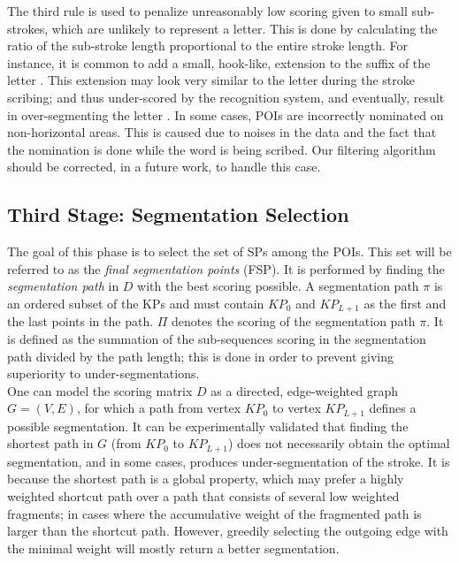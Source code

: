 \documentclass[10pt, conference, compsocconf]{IEEEtran}
\begin{document}
The third rule is used to penalize unreasonably low scoring given to small sub-strokes, which are unlikely to represent a letter. 
This is done by calculating the ratio of the sub-stroke length proportional to the entire stroke length.
For instance, it is common to add a small, hook-like, extension to the suffix of the letter . 
This extension may look very similar to the letter  during the stroke scribing; and thus under-scored by the recognition system, and eventually, result in over-segmenting the letter . In some cases, POIs are incorrectly nominated on non-horizontal areas. This is caused due to noises in the data and the fact that the nomination is done while the word is being scribed. Our filtering algorithm should be corrected, in a future work, to handle this case.

\subsection{Third Stage: Segmentation Selection}
The goal of this phase is to select the set of SPs among the POIs. 
This set will be referred to as the \emph{final segmentation points} (FSP). 
It is performed by finding the \emph{segmentation path} in $D$ with the best scoring possible. 
A segmentation path $\pi$ is an ordered subset of the KPs and must contain $KP_{0}$ and $KP_{L+1}$ as the first and the last points in the path.
$\Pi$ denotes the scoring of the segmentation path $\pi$. 
It is defined as the summation of the sub-sequences scoring in the segmentation path divided by the path length; this is done in order to prevent giving superiority to under-segmentations.\\

One can model the scoring matrix $D$ as a directed, edge-weighted graph $G=(V,E)$, for which a path from vertex $KP_0$ to vertex $KP_{L+1}$ defines a possible segmentation. 
It can be experimentally validated that finding the shortest path in $G$ (from $KP_0$ to $KP_{L+1}$) does not necessarily obtain the optimal segmentation, and in some cases, produces under-segmentation of the stroke. 
It is because the shortest path is a global property, which may prefer a highly weighted shortcut path over a path that consists of several low weighted fragments; in cases where the accumulative weight of the fragmented path is larger than the shortcut path.
However, greedily selecting the outgoing edge with the minimal weight will mostly return a better segmentation.\\
\end{document}
